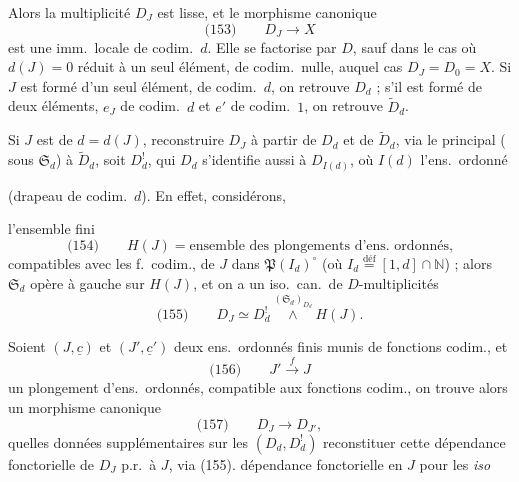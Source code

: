 \documentclass[11pt,a4paper]{article}
\begin{document}

Alors la multiplicité $D_J$ est lisse, \struck{\ill{}} et le morphisme canonique
\[
  \text{(153)}\qquad D_J \longrightarrow X
\]
est une imm.\ locale de codim.\ $d$. Elle se factorise par $D$, sauf dans le
cas où $d(J) = 0$   réduit à un seul élément, de codim.\ nulle,
auquel cas $D_J = D_0 = X$. Si $J$ est formé d'un seul élément, de codim.\ $d$,
on retrouve $D_d$ ; s'il est formé de deux éléments,  $e_J$ de
codim.\ $d$ et $e'$ de codim.\ $1$, on retrouve $\widetilde{D}_d$.

Si $J$ est de \ill{}  $d = d(J)$,  \struck{\ill{}} reconstruire
$D_J$ à partir de $D_d$ et de $\widetilde{D}_d$, via le  principal
( sous $\mathfrak{S}_d$)  à $\widetilde{D}_d$, soit
$D^{!}_d$, qui  $D_d$ s'identifie aussi à $D_{I(d)}$, où $I(d)$
 l'ens.\ ordonné


(drapeau  de codim.\ $d$). En effet, considérons,

l'ensemble fini
\[
  \text{(154)}\qquad H(J) = \text{ensemble des plongements d'ens.\ ordonnés,}
\]
compatibles avec les f.\ codim., de $J$ dans 
$\mathfrak{P}(I_d)^{\circ}$ (où $I_d \overset{\text{déf}}{=} [1,d] \cap \mathbb{N}$) ;
alors $\mathfrak{S}_d$ opère à gauche sur $H(J)$, et on a un iso.\ can.\ de
$D$-multiplicités
\[
  \text{(155)}\qquad D_J \simeq D^{!}_d \overset{(\mathfrak{S}_d)_{D_d}}{\wedge} H(J) .
\]

Soient \struck{\ill{}} $(J, \underline{c})$ et $(J', \underline{c}')$ deux ens.\ ordonnés finis munis de
fonctions codim., et
\[
  \text{(156)}\qquad J' \overset{f}{\longrightarrow} J
\]
un plongement d'ens.\ ordonnés, compatible aux fonctions codim., on trouve alors
un  morphisme canonique
\[
  \text{(157)}\qquad D_J \longrightarrow D_{J'} ,
\]
 \ill{} \struck{\ill{}}  quelles données supplémentaires
 sur les $(D_d, D^{!}_d)$  reconstituer cette
dépendance fonctorielle   de $D_J$ p.r.\ à $J$, via (155).
 \ill{} dépendance fonctorielle en $J$
pour les \emph{iso}
\end{document}
